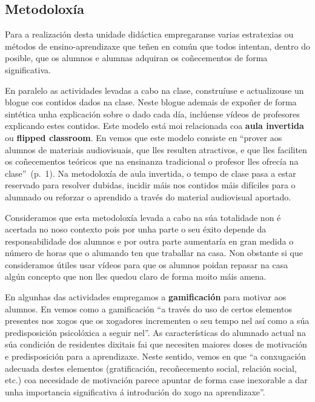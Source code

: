 \subsection{Metodoloxía}

Para a realización desta unidade didáctica empregaranse varias estratexias ou métodos de ensino-aprendizaxe que teñen en común que todos intentan, dentro do posible, que os alumnos e alumnas adquiran os coñecementos de forma significativa.

En paralelo as actividades levadas a cabo na clase, construíuse e actualizouse un blogue cos contidos dados na clase. Neste blogue ademais de expoñer de forma sintética unha explicación sobre o dado cada día, inclúense vídeos de profesores explicando estes contidos. Este modelo está moi relacionada coa \textbf{aula invertida} ou \textbf{flipped classroom}. En  vemos que este modelo consiste en ``prover aos alumnos de materiais audiovisuais, que lles resulten atractivos, e que lles faciliten os coñecementos teóricos que na ensinanza tradicional o profesor lles ofrecía na clase''~(p.~1). Na metodoloxía de aula invertida, o tempo de clase pasa a estar reservado para resolver dubidas, incidir máis nos contidos máis difíciles para o alumnado ou reforzar o aprendido a través do material audiovisual aportado.

Consideramos que esta metodoloxía levada a cabo na súa totalidade non é acertada no noso contexto pois por unha parte o seu éxito depende da responsabilidade dos alumnos e por outra parte aumentaría en gran medida o número de horas que o alumando ten que traballar na casa. Non obstante si que consideramos útiles usar vídeos para que os alumnos poidan repasar na casa algún concepto que non lles quedou claro de forma moito máis amena.

En algunhas das actividades empregamos a \textbf{gamificación} para motivar aos alumnos. En  vemos como a gamificación ``a través do uso de certos elementos presentes nos xogos que os xogadores incrementen o seu tempo nel así como a súa predisposición psicolóxica a seguir nel''. As características do alumnado actual na súa condición de residentes dixitais \cite{residentesdigitales} fai que necesiten maiores doses de motivación e predisposición para a aprendizaxe. Neste sentido, vemos en  que ``a conxugación adecuada destes elementos (gratificación, recoñecemento social, relación social, etc.) coa necesidade de motivación parece apuntar de forma case inexorable a dar unha importancia significativa á introdución do xogo na aprendizaxe''.

